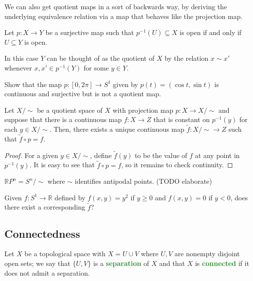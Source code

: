 \documentclass[11pt]{scrartcl}
\providecommand{\RR}{\mathbb R}
\providecommand{\inv}{^{-1}}
\renewcommand{\tilde}{\widetilde}
\providecommand{\vocab}[1]{{\textbf{\textcolor{ForestGreen}{#1}}}}
\begin{document}
We can also get quotient maps in a sort of backwards way,
by deriving the underlying equivalence relation via
a map that behaves like the projection map.
\begin{definition}
    \label{def:quotient-map}
    Let $p\colon X\to Y$ be a surjective map such that $p\inv(U)\subseteq X$
    is open if and only if $U\subseteq Y$ is open.
\end{definition}
In this case $Y$ can be thought of as the quotient of $X$ by the relation
$x\sim x'$ whenever $x,x'\in p\inv(Y)$ for some $y\in Y$.
\begin{exercise}
    Show that the map $p\colon[0,2\pi]\to S^1$ given by
    $p(t) = (\cos t,\sin t)$ is continuous and surjective
    but is not a quotient map.
\end{exercise}

\begin{prop}
    \label{prop:quotient-universal-property}
    Let $X/{\sim}$ be a quotient space of $X$ with
    projection map $p\colon X\to X/{\sim}$
    and suppose that there is a continuous map $f\colon X\to Z$
    that is constant on $p\inv(y)$ for each $y\in X/{\sim}$.
    Then, there exists a unique continuous map $\tilde f\colon X/{\sim}\to Z$
    such that $\tilde f\circ p = f$. 
\end{prop}

\begin{proof}
    For a given $y\in X/{\sim}$, define $\tilde f(y)$ to be
    the value of $f$ at any point in $p\inv(y)$.
    It is easy to see that $\tilde f\circ p = f$,
    so it remains to check continuity.
\end{proof}

\begin{example}
    $\RR P^n = S^n/{\sim}$ where $\sim$ identifies antipodal points.
    (TODO elaborate)
\end{example}

Given $f\colon S^1\to\RR$ defined by $f(x,y) = y^2$ if $y\ge0$
and $f(x,y)=0$ if $y<0$, does there exist a corresponding $\tilde f$?

\subsection{Connectedness}

\begin{definition}[Connectedness]
    \label{def:connectned}
    Let $X$ be a topological space with $X = U\cup V$
    where $U,V$ are nonempty disjoint open sets; we say that $\{U,V\}$ is
    a \vocab{separation} of $X$ and that $X$ is \vocab{connected}
    if it does not admit a separation.
\end{definition}
\end{document}

